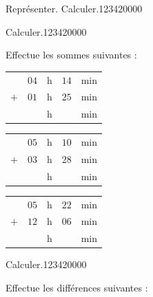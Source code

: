 \begin{pageParcoursu}
\begin{ExoCu}{Représenter. Calculer.}{1234}{2}{0}{0}{0}{0}
\end{ExoCu}

\begin{ExoCu}{ Calculer.}{1234}{2}{0}{0}{0}{0}
 
 
 Effectue  les sommes suivantes :
 
\begin{minipage}{0.30\linewidth}
\begin{tabular}{ccccc} 
& $04$ & h &  $14$ & min \\ 
$+$   & $01$ & h & $25$  & min\\ 
\hline 
   &  & h & & min\\
\end{tabular} 
\end{minipage}
\hfill 
\begin{minipage}{0.30\linewidth}
 \begin{tabular}{ccccc} 
& $05$ & h &  $10$ & min \\ 
$+$   & $03$ & h &  $28$ & min\\ 
\hline 
   &  & h & & min\\
\end{tabular} 
\end{minipage}
\hfill 
\begin{minipage}{0.30\linewidth}
 \begin{tabular}{ccccc} 
& $05$ & h & $22$  & min \\ 
$+$   & $12$ & h & $06$ & min\\ 
\hline 
   &  & h & & min\\
\end{tabular} 
\end{minipage}
 
 
\end{ExoCu}

\begin{ExoCu}{ Calculer.}{1234}{2}{0}{0}{0}{0}
 
 

Effectue  les différences suivantes :
 

\end{ExoCu}
\end{pageParcoursu}
